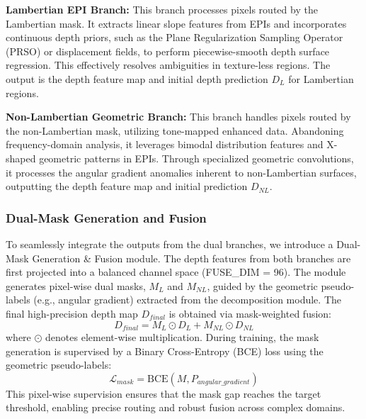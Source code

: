 \documentclass[lettersize,journal]{IEEEtran}
\begin{document}
\textbf{Lambertian EPI Branch:} This branch processes pixels routed by the Lambertian mask. It extracts linear slope features from EPIs and incorporates continuous depth priors, such as the Plane Regularization Sampling Operator (PRSO) or displacement fields, to perform piecewise-smooth depth surface regression. This effectively resolves ambiguities in texture-less regions. The output is the depth feature map and initial depth prediction $D_L$ for Lambertian regions.

\textbf{Non-Lambertian Geometric Branch:} This branch handles pixels routed by the non-Lambertian mask, utilizing tone-mapped enhanced data. Abandoning frequency-domain analysis, it leverages bimodal distribution features and X-shaped geometric patterns in EPIs. Through specialized geometric convolutions, it processes the angular gradient anomalies inherent to non-Lambertian surfaces, outputting the depth feature map and initial prediction $D_{NL}$.

\subsubsection{Dual-Mask Generation and Fusion}
To seamlessly integrate the outputs from the dual branches, we introduce a Dual-Mask Generation \& Fusion module. The depth features from both branches are first projected into a balanced channel space (FUSE\_DIM = 96). The module generates pixel-wise dual masks, $M_L$ and $M_{NL}$, guided by the geometric pseudo-labels (e.g., angular gradient) extracted from the decomposition module. The final high-precision depth map $D_{final}$ is obtained via mask-weighted fusion:
\begin{equation}
D_{final} = M_L \odot D_L + M_{NL} \odot D_{NL}
\label{eq:ch3_2}
\end{equation}
where $\odot$ denotes element-wise multiplication. During training, the mask generation is supervised by a Binary Cross-Entropy (BCE) loss using the geometric pseudo-labels:
\begin{equation}
\mathcal{L}_{mask} = \text{BCE}(M, P_{angular\_gradient})
\label{eq:ch3_3}
\end{equation}
This pixel-wise supervision ensures that the mask gap reaches the target threshold, enabling precise routing and robust fusion across complex domains.
\end{document}
